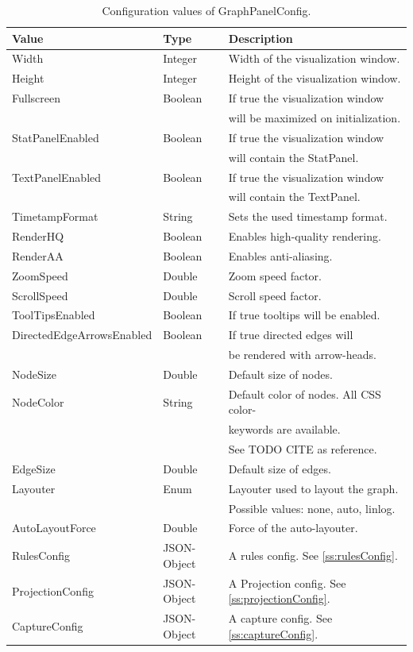 \begin{table}[h]
\centering
\begin{tabular}[h]{|l|l|l|}\hline
	\textbf{Value} & \textbf{Type} & \textbf{Description}\\
	\hline
	Width & Integer & Width of the visualization window.\\
	\hline
	Height & Integer & Height of the visualization window.\\
	\hline
	Fullscreen & Boolean & If true the visualization window\\
	& & will be maximized on initialization.\\
	\hline
	StatPanelEnabled & Boolean & If true the visualization window\\
	& & will contain the StatPanel.\\
	\hline
	TextPanelEnabled & Boolean & If true the visualization window\\
	& & will contain the TextPanel.\\
	\hline
	TimetampFormat & String & Sets the used timestamp format.\\
	\hline
	RenderHQ & Boolean & Enables high-quality rendering.\\
	\hline
	RenderAA & Boolean & Enables anti-aliasing.\\
	\hline
	ZoomSpeed & Double & Zoom speed factor.\\
	\hline
	ScrollSpeed & Double & Scroll speed factor.\\
	\hline	
	ToolTipsEnabled & Boolean & If true tooltips will be enabled.\\
	\hline	
	DirectedEdgeArrowsEnabled & Boolean & If true directed edges will\\
	& & be rendered with arrow-heads.\\
	\hline
	NodeSize & Double & Default size of nodes.\\
	\hline
	NodeColor & String & Default color of nodes. All CSS color-\\
	& & keywords are available.\\
	& & See TODO CITE as reference.\\
	\hline
	EdgeSize & Double & Default size of edges.\\
	\hline
	Layouter & Enum & Layouter used to layout the graph.\\
	& & Possible values: none, auto, linlog.\\
	\hline
	AutoLayoutForce & Double & Force of the auto-layouter.\\
	\hline
	RulesConfig & JSON-Object & A rules config. See \ref{ss:rulesConfig}.\\
	\hline
	ProjectionConfig & JSON-Object & A Projection config. See \ref{ss:projectionConfig}.\\
	\hline
	CaptureConfig & JSON-Object & A capture config. See \ref{ss:captureConfig}.\\
	\hline
\end{tabular}
\caption{Configuration values of GraphPanelConfig.}
\label{tab:graphPanelConfigValues}
\end{table}

